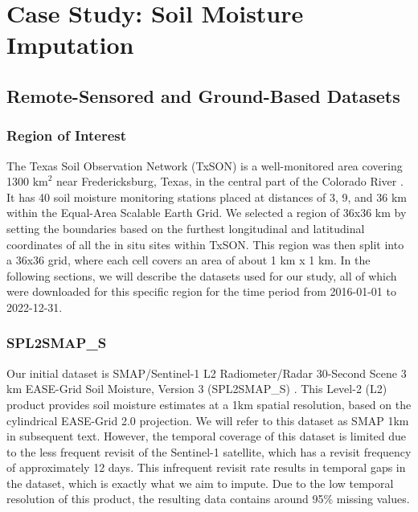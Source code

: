 \documentclass[11pt]{article}
\begin{document}
\section{Case Study: Soil Moisture Imputation}
\subsection{Remote-Sensored and Ground-Based Datasets}

\subsubsection*{Region of Interest}

The Texas Soil Observation Network (TxSON) is a well-monitored area covering 1300 $\text{km}^2$ near Fredericksburg, Texas, in the central part of the Colorado River \citep{caldwell2019texas}. It has 40 soil moisture monitoring stations placed at distances of 3, 9, and 36 km within the Equal-Area Scalable Earth Grid. We selected a region of 36x36 km by setting the boundaries based on the furthest longitudinal and latitudinal coordinates of all the in situ sites within TxSON. This region was then split into a 36x36 grid, where each cell covers an area of about 1 km x 1 km. 
In the following sections, we will describe the datasets used for our study, all of which were downloaded for this specific region for the time period from 2016-01-01 to 2022-12-31.

\subsubsection*{SPL2SMAP\_S}
Our initial dataset is SMAP/Sentinel-1 L2 Radiometer/Radar 30-Second Scene 3 km EASE-Grid Soil Moisture, Version 3 (SPL2SMAP\_S) \citep{das2019smap}. This Level-2 (L2) product provides soil moisture estimates at a 1km spatial resolution, based on the cylindrical EASE-Grid 2.0 \citep{brodzik2012ease} projection. We will refer to this dataset as SMAP 1km in subsequent text. However, the temporal coverage of this dataset is limited due to the less frequent revisit of the Sentinel-1 satellite, which has a revisit frequency of approximately 12 days. This infrequent revisit rate results in temporal gaps in the dataset, which is exactly what we aim to impute. Due to the low temporal resolution of this product, the resulting data contains around 95\% missing values.
\end{document}
